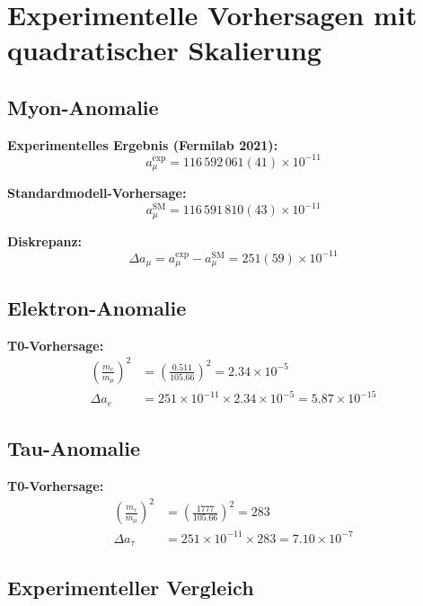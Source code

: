 \documentclass[12pt,a4paper]{article}
\begin{document}
	\section{Experimentelle Vorhersagen mit quadratischer Skalierung}
	
	\subsection{Myon-Anomalie}
	
	\textbf{Experimentelles Ergebnis (Fermilab 2021):}
	\begin{equation}
		a_\mu^{\text{exp}} = 116\,592\,061(41) \times 10^{-11}
	\end{equation}
	
	\textbf{Standardmodell-Vorhersage:}
	\begin{equation}
		a_\mu^{\text{SM}} = 116\,591\,810(43) \times 10^{-11}
	\end{equation}
	
	\textbf{Diskrepanz:}
	\begin{equation}
		\Delta a_\mu = a_\mu^{\text{exp}} - a_\mu^{\text{SM}} = 251(59) \times 10^{-11}
	\end{equation}
	
	\subsection{Elektron-Anomalie}
	
	\textbf{T0-Vorhersage:}
	\begin{align}
		\left(\frac{m_e}{m_\mu}\right)^2 &= \left(\frac{0.511}{105.66}\right)^2 = 2.34 \times 10^{-5} \\
		\Delta a_e &= 251 \times 10^{-11} \times 2.34 \times 10^{-5} = 5.87 \times 10^{-15}
	\end{align}
	
	\subsection{Tau-Anomalie}
	
	\textbf{T0-Vorhersage:}
	\begin{align}
		\left(\frac{m_\tau}{m_\mu}\right)^2 &= \left(\frac{1777}{105.66}\right)^2 = 283 \\
		\Delta a_\tau &= 251 \times 10^{-11} \times 283 = 7.10 \times 10^{-7}
	\end{align}
	
	\subsection{Experimenteller Vergleich}
	
\end{document}
